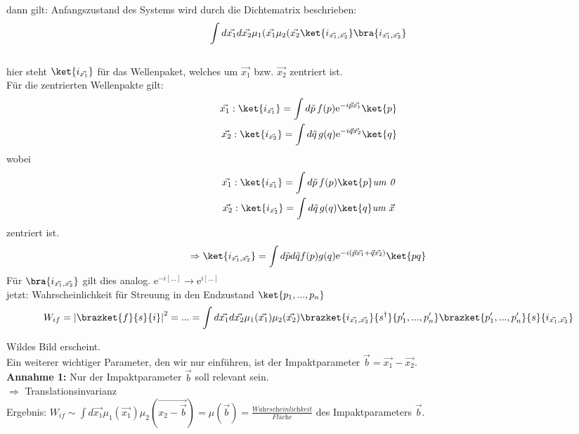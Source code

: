 dann gilt: Anfangszustand des Systems wird durch die Dichtematrix beschrieben: 
\\
\[ \int d\vec{x_1} d\vec{x_2} \mu_1(\vec{x_1} \mu_2(\vec{x_2} 
\ket{i_{\vec{x_1},\vec{x_2}}} \bra{i_{\vec{x_1},\vec{x_2}}}\] \\
hier steht $\ket{i_{\vec{x_1}}}$ für das Wellenpaket, welches um $\vec{x_1}$ 
bzw. $\vec{x_2}$ zentriert ist. \\
Für die zentrierten Wellenpakte gilt: 
\begin{align*}
\vec{x_1}: \ket{i_{\vec{x_1}}} = \int d\tilde{p}\, f(p) \mathrm{e}^{-i\vec{p} 
\vec{x_1}} \ket{p} \\
\vec{x_2}: \ket{i_{\vec{x_2}}} = \int d\tilde{q}\, g(q) \mathrm{e}^{-i\vec{q} 
\vec{x_2}} \ket{q}
\end{align*}
wobei \begin{align*}
\vec{x_1}: \ket{i_{\vec{x_1}}} = \int d\tilde{p}\, f(p) \ket{p} \textit{um 0}\\
\vec{x_2}: \ket{i_{\vec{x_2}}} = \int d\tilde{q}\, g(q) \ket{q} \textit{um 
$\vec{x}$}
\end{align*} zentriert ist. \\
\[\Rightarrow \ket{i_{\vec{x_1},\vec{x_2}}} = \int d\tilde{p} d\tilde{q} f(p) 
g(q) \mathrm{e}^{-i\left(\vec{p} \vec{x_1} + \vec{q} \vec{x_2} \right)} \ket{p 
q} \]
Für $\bra{i_{\vec{x_1},\vec{x_2}}}$ gilt dies analog. $\mathrm{e}^{-i[...]} \to 
\mathrm{e}^{i[...]}$ \\
jetzt: Wahrscheinlichkeit für Streuung in den Endzustand $\ket{p_1, ... , 
p_n}$\\
\[W_{if} = {\left| \brazket{f}{s}{i} \right|}^2 = ... = \int d\vec{x_1} 
d\vec{x_2} \mu_1(\vec{x_1}) \mu_2(\vec{x_2}) 
\brazket{i_{\vec{x_1},\vec{x_2}}}{s^{\dagger}}{p_1', ... , p_n'} \brazket{p_1', 
... , p_n'}{s}{i_{\vec{x_1},\vec{x_2}}} \]

Wildes Bild erscheint.\\
Ein weiterer wichtiger Parameter, den wir nur einführen, ist der 
Impaktparameter $\vec{b} = \vec{x_1} - \vec{x_2}$. \\

\textbf{Annahme 1:} Nur der Impaktparameter $\vec{b}$ soll relevant sein. \\
$\Rightarrow$ Translationsinvarianz \\
Ergebnis: $W_{if} \sim \int d\vec{x_1} \mu_1(\vec{x_1}) 
\mu_2(\vec{x_2-\vec{b}}) = \mu(\vec{b}) = 
\frac{\textit{Wahrscheinlichkeit}}{\textit{Fläche}} $ des Impaktparameters 
$\vec{b}$. \\

